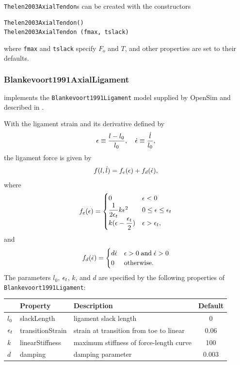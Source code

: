 {\tt Thelen2003AxialTendon}s can be created with the constructors
\begin{lstlisting}[]
Thelen2003AxialTendon()
Thelen2003AxialTendon (fmax, tslack)
\end{lstlisting}
%
where {\tt fmax} and {\tt tslack} specify $F_{o}$ and $T$, and
other properties are set to their defaults.

\subsubsection{Blankevoort1991AxialLigament}

implements the {\tt Blankevoort1991Ligament} model supplied
by OpenSim \cite{delp2007opensim} and described in
\cite{blankevoort1991ligament,smith2016influence}.

With the ligament strain and its derivative defined by
%
\begin{equation}
\epsilon \equiv \frac{l-l_0}{l_0}, \quad \dot{\epsilon} \equiv \frac{\dot l}{l_0},
\end{equation}
%
the ligament force is given by
%
\begin{equation}
f(l,\dot l) = f_e(\epsilon) + f_d(\dot {\epsilon}),
\end{equation}
%
where
%
\begin{equation*}
f_e(\epsilon) = 
\begin{cases}
0 & \epsilon < 0 \\
\dfrac{1}{2 \epsilon_t} k \epsilon^2 & 0 \le \epsilon \le \epsilon_t\\
k(\epsilon - \dfrac{\epsilon_t}{2}) & \epsilon > \epsilon_t,
\end{cases}
\end{equation*}
%
and
%
\begin{equation*}
f_d(\dot{\epsilon}) = 
\begin{cases}
d \dot{\epsilon}  & \epsilon > 0 \; \mathrm{and} \; \dot{\epsilon} > 0 \\
0 & \mathrm{otherwise}.
\end{cases}
\end{equation*}
%
The parameters $l_0$, $\epsilon_t$, $k$, and $d$ are specified by the following
properties of {\tt Blankevoort1991Ligament}:

\begin{center}
\begin{tabular}{|l|l|l|c|} 
\hline
& Property & Description & Default\\
\hline
$l_0$ & {\sf slackLength} &
ligament slack length & 0 \\
$\epsilon_t$ & {\sf transitionStrain} & 
strain at transition from toe to linear & 0.06 \\
$k$ & {\sf linearStiffness} & 
maximum stiffness of force-length curve & 100 \\
$d$ & {\sf damping} & 
damping parameter & 0.003 \\
\hline
\end{tabular}
\end{center}

